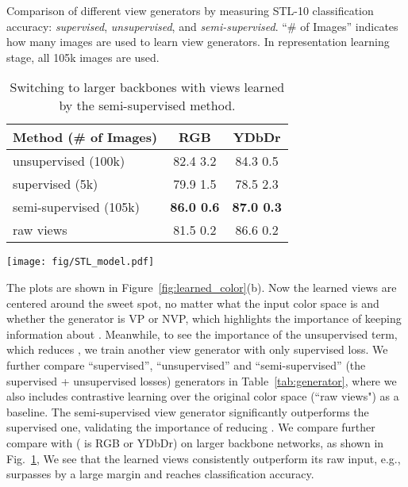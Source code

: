 \documentclass{article}
\begin{document}
\begin{table}[t]
\centering
\begin{minipage}[c]{0.53\textwidth}
\centering
\small
\caption{\label{tab:generator} \small Comparison of different view generators by measuring STL-10 classification accuracy: \emph{supervised}, \emph{unsupervised}, and \emph{semi-supervised}. ``\# of Images'' indicates how many images are used to learn view generators. In representation learning stage, all 105k images are used.}
\begin{tabular}{l|cc}
\toprule
Method (\# of Images) & RGB & YDbDr \\
\midrule
unsupervised (100k) & 82.4  3.2 & 84.3  0.5 \\
supervised (5k) & 79.9  1.5 & 78.5  2.3 \\
semi-supervised (105k) & \textbf{86.0  0.6} & \textbf{87.0  0.3}\\
\midrule
raw views & 81.5  0.2 & 86.6  0.2 \\
\bottomrule
\end{tabular}
\end{minipage}\hfill
\begin{minipage}[c]{0.46\textwidth}
\captionsetup{type=figure}
\texttt{[image: fig/STL\_model.pdf]}
\vspace{-3pt}
\caption{\label{tab:stl_model} \small Switching to larger backbones with views learned by the semi-supervised method.}
\end{minipage}
\end{table}  The plots are shown in Figure~\ref{fig:learned_color}(b). Now the learned views are centered around the sweet spot, no matter what the input color space is and whether the generator is VP or NVP, which highlights the importance of keeping information about . Meanwhile, to see the importance of the unsupervised term, which reduces , we train another view generator with only supervised loss. We further compare ``supervised'', ``unsupervised'' and ``semi-supervised'' (the supervised + unsupervised losses) generators in Table~\ref{tab:generator}, where we also includes contrastive learning over the original color space (``raw views") as a baseline. 
The semi-supervised view generator significantly outperforms the supervised one, validating the importance of reducing . We compare further compare  with  ( is RGB or YDbDr) on larger backbone networks, as shown in Fig.~\ref{tab:stl_model}, We see that the learned views consistently outperform its raw input, e.g.,  surpasses  by a large margin and reaches  classification accuracy.
\end{document}
